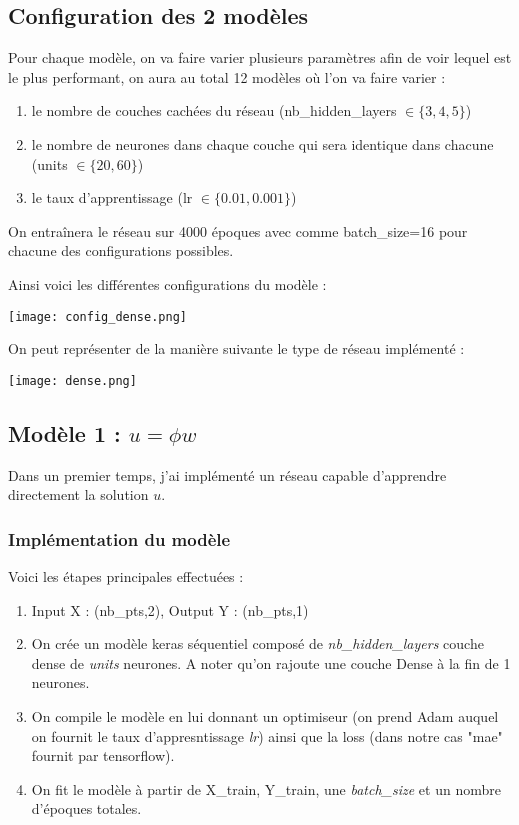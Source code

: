 \subsection{Configuration des 2 modèles}

Pour chaque modèle, on va faire varier plusieurs paramètres afin de voir lequel est le plus performant, on aura au total 12 modèles où l'on va faire varier :
\begin{enumerate}[label=\textbullet]
	\item le nombre de couches cachées du réseau (nb\_hidden\_layers $\in\{3,4,5\}$)
	\item le nombre de neurones dans chaque couche qui sera identique dans chacune (units $\in\{20,60\}$)
	\item le taux d'apprentissage (lr $\in\{0.01,0.001\}$)
\end{enumerate}
On entraînera le réseau sur 4000 époques avec comme batch\_size=16 pour chacune des configurations possibles.

Ainsi voici les différentes configurations du modèle :

\begin{minipage}{\linewidth}
	\centering
	\texttt{[image: config\_dense.png]}
\end{minipage}

On peut représenter de la manière suivante le type de réseau implémenté :

\begin{minipage}{\linewidth}
	\centering
	\texttt{[image: dense.png]}
\end{minipage}

\newpage

\subsection{Modèle 1 : $u=\phi w$}

Dans un premier temps, j'ai implémenté un réseau capable d'apprendre directement la solution $u$. 

\subsubsection{Implémentation du modèle}

Voici les étapes principales effectuées :
\begin{enumerate}[label=\textbullet]
	\item Input X : (nb\_pts,2), Output Y : (nb\_pts,1)  
	\item On crée un modèle keras séquentiel composé de \textit{nb\_hidden\_layers} couche dense de \textit{units} neurones. A noter qu'on rajoute une couche Dense à la fin de 1 neurones.
	\item On compile le modèle en lui donnant un optimiseur (on prend Adam auquel on fournit le taux d'appresntissage \textit{lr}) ainsi que la loss (dans notre cas "mae" fournit par tensorflow).
	\item On fit le modèle à partir de X\_train, Y\_train, une \textit{batch\_size} et un nombre d'époques totales.
\end{enumerate}

